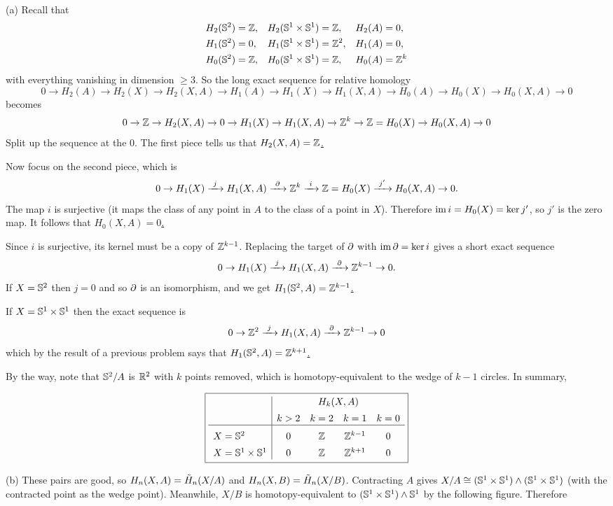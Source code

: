 \soln (a) Recall that
\begin{align*}
H_2(\mathbb{S}^2)&=\mathbb{Z}, & 
H_2(\mathbb{S}^1\times \mathbb{S}^1)&=\mathbb{Z}, & 
H_2(A)&=0, \\
H_1(\mathbb{S}^2)&= 0, & 
H_1(\mathbb{S}^1\times \mathbb{S}^1)&= \mathbb{Z}^2, & 
H_1(A)&= 0, \\ 
H_0(\mathbb{S}^2)&=\mathbb{Z}, & 
H_0(\mathbb{S}^1\times \mathbb{S}^1)&=\mathbb{Z}, & 
H_0(A)&=\mathbb{Z}^k
\end{align*}
with everything vanishing in dimension $\geq3$.
So the long exact sequence for relative homology
\[0\to H_2(A) \to H_2(X)\to H_2(X,A)\to H_1(A)\to H_1(X)\to H_1(X,A)\to H_0(A)\to H_0(X)\to H_0(X,A)\to 0\]
becomes
\[0\to \mathbb{Z}\to H_2(X,A)\to 0\to H_1(X)\to H_1(X,A)\to \mathbb{Z}^k\to \mathbb{Z}=H_0(X)\to H_0(X,A)\to 0\]
Split up the sequence at the 0.  The first piece tells us that \boldmath\underline{$H_2(X,A)=\mathbb{Z}$.}\unboldmath

Now focus on the second piece, which is
\[0\to H_1(X)\xrightarrow{~j~} H_1(X,A)\xrightarrow{~\partial~} \mathbb{Z}^k\xrightarrow{~i~} \mathbb{Z}=H_0(X)\xrightarrow{~j'~} H_0(X,A)\to 0.\]
The map $i$ is surjective (it maps the class of any point in $A$ to the class of a point in $X$).  Therefore
$\operatorname{im} i=H_0(X)=\ker j'$, so $j'$ is the zero map.  It follows that  \boldmath\underline{$H_0(X,A)=0$. }\unboldmath

Since $i$ is surjective, its kernel must be a copy of $\mathbb{Z}^{k-1}$.  Replacing the target of $\partial$ with $\operatorname{im}\partial=\ker i$ gives a  short exact sequence
\[0\to H_1(X)\xrightarrow{~j~} H_1(X,A)\xrightarrow{~\partial~} \mathbb{Z}^{k-1}\to 0.\]
If $X=\mathbb{S}^2$ then $j=0$ and so $\partial$ is an isomorphism, and we get  \boldmath\underline{$H_1(\mathbb{S}^2,A)=\mathbb{Z}^{k-1}$. }\unboldmath

If $X=\mathbb{S}^1\times \mathbb{S}^1$ then the exact sequence is
\[0\to \mathbb{Z}^2\xrightarrow{~j~} H_1(X,A)\xrightarrow{~\partial~} \mathbb{Z}^{k-1}\to 0\]
which by the result of a previous problem says that  \boldmath\underline{$H_1(\mathbb{S}^2,A)=\mathbb{Z}^{k+1}$. }\unboldmath

By the way, note that $\mathbb{S}^2/A$ is $\mathbb{R}^2$ with $k$ points removed, which is homotopy-equivalent to the wedge of $k-1$ circles.  In summary,

\[\boxed{\begin{array}{l|cccc}
& \multicolumn{4}{c}{H_k(X,A)}\paddown \\
& k>2 & k=2 & k=1 & k=0 \\ \hline
\pad X=\Ss^2 & 0 & \Zz & \Zz^{k-1} & 0\\
X=\Ss^1\x\Ss^1 & 0 & \Zz & \Zz^{k+1} & 0
\end{array}}\]

\soln (b) These pairs are good, so $H_n(X,A)=\tilde H_n(X/A)$ and $H_n(X,B)=\tilde H_n(X/B)$.   
Contracting $A$ gives $X/A\cong(\mathbb{S}^1\times\mathbb{S}^1)\wedge(\mathbb{S}^1\times\mathbb{S}^1)$ (with the contracted point as the wedge point).  Meanwhile, $X/B$ is homotopy-equivalent to $( \mathbb{S}^1\times\mathbb{S}^1)\wedge \mathbb{S}^1$ by the following figure.
Therefore
\pagebreak

